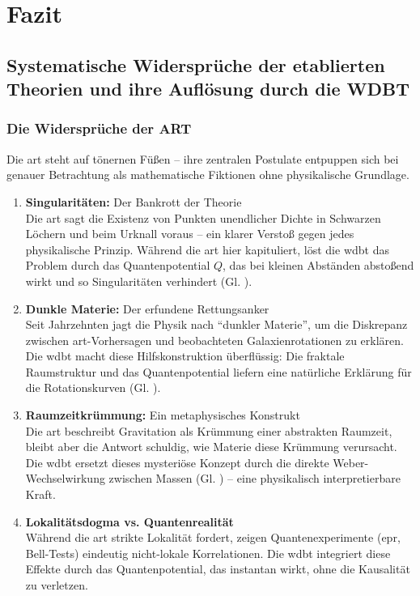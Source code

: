 \chapter{Fazit}
\section{Systematische Widersprüche der etablierten Theorien und ihre Auflösung durch die WDBT}
\subsection{Die Widersprüche der ART}
Die \gls{art} steht auf tönernen Füßen – ihre zentralen Postulate entpuppen sich bei genauer Betrachtung als mathematische Fiktionen ohne physikalische Grundlage.
\begin{enumerate}
    \item \textbf{Singularitäten:} Der Bankrott der Theorie\\Die \gls{art} sagt die Existenz von Punkten unendlicher Dichte in Schwarzen Löchern und beim Urknall voraus – ein klarer Verstoß gegen jedes physikalische Prinzip. Während die \gls{art} hier kapituliert, löst die \gls{wdbt} das Problem durch das Quantenpotential $Q$, das bei kleinen Abständen abstoßend wirkt und so Singularitäten verhindert (Gl. ).
    \item \textbf{Dunkle Materie:} Der erfundene Rettungsanker\\Seit Jahrzehnten jagt die Physik nach \enquote{dunkler Materie}, um die Diskrepanz zwischen \gls{art}-Vorhersagen und beobachteten Galaxienrotationen zu erklären. Die \gls{wdbt} macht diese Hilfskonstruktion überflüssig: Die fraktale Raumstruktur und das Quantenpotential liefern eine natürliche Erklärung für die Rotationskurven (Gl. ).
    \item \textbf{Raumzeitkrümmung:} Ein metaphysisches Konstrukt\\Die \gls{art} beschreibt Gravitation als Krümmung einer abstrakten Raumzeit, bleibt aber die Antwort schuldig, wie Materie diese Krümmung verursacht. Die \gls{wdbt} ersetzt dieses mysteriöse Konzept durch die direkte Weber-Wechselwirkung zwischen Massen (Gl. ) – eine physikalisch interpretierbare Kraft.
    \item \textbf{Lokalitätsdogma vs. Quantenrealität}\\Während die \gls{art} strikte Lokalität fordert, zeigen Quantenexperimente (\gls{epr}, Bell-Tests) eindeutig nicht-lokale Korrelationen. Die \gls{wdbt} integriert diese Effekte durch das Quantenpotential, das instantan wirkt, ohne die Kausalität zu verletzen.
\end{enumerate}
